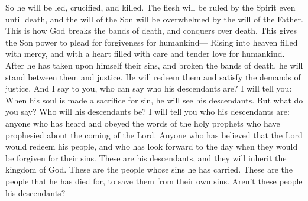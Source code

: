 So he will be led, crucified, and killed. The flesh will be ruled by the Spirit even until death, and the will of the Son will be overwhelmed by the will of the Father.
\bverse \iffalse And thus God breaketh the bands of death, having gained the victory over death; giving the Son power to make intercession for the children of men-- \fi
This is how God breaks the bands of death, and conquers over death. This gives the Son power to plead for forgiveness for humankind---
\bverse \iffalse Having ascended into heaven, having the bowels of mercy; being filled with compassion towards the children of men; standing betwixt them and justice; having broken the bands of death, taken upon himself their iniquity and their transgressions, having redeemed them, and satisfied the demands of justice. \fi
Rising into heaven filled with mercy, and with a heart filled with care and tender love for humankind. After he has taken upon himself their sins, and broken the bands of death, he will stand between them and justice. He will redeem them and satisfy the demands of justice.
\bverse \iffalse And now I say unto you, who shall declare his generation?  Behold, I say unto you, that when his soul has been made an offering for sin he shall see his seed. And now what say ye?  And who shall be his seed? \fi
And I say to you, who can say who his descendants are? I will tell you: When his soul is made a sacrifice for sin, he will see his descendants. But what do you say? Who will his descendants be?
\bverse \iffalse Behold I say unto you, that whosoever has heard the words of the prophets, yea, all the holy prophets who have prophesied concerning the coming of the Lord--I say unto you, that all those who have hearkened unto their words, and believed that the Lord would redeem his people, and have looked forward to that day for a remission of their sins, I say unto you, that these are his seed, or they are heirs of the kingdom of God. \fi
I will tell you who his descendants are: anyone who has heard and obeyed the words of the holy prophets who have prophesied about the coming of the Lord. Anyone who has believed that the Lord would redeem his people, and who has look forward to the day when they would be forgiven for their sins. These are his descendants, and they will inherit the kingdom of God.
\bverse \iffalse For these are they whose sins he has borne; these are they for whom he has died, to redeem them from their transgressions.  And now, are they not his seed? \fi
These are the people whose sins he has carried. These are the people that he has died for, to save them from their own sins. Aren't these people his descendants?
